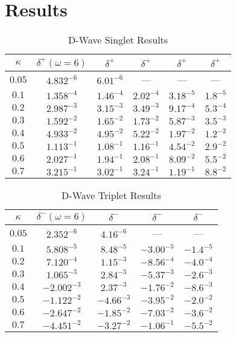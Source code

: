 \documentclass[Dissertation.tex]{subfiles}
\begin{document}
\section{Results}



\begin{table}[H]
\begin{center}
\begin{tabular}{|c|c|c|c|c|c|}
\hline
$\kappa$ & $\delta^+ (\omega = 6)$ & $\delta^+$ \cite{Blackwood2002} & $\delta^+$ \cite{Walters2004} & $\delta^+$ \cite{Ray1997} & $\delta^+$ \cite{Adhikari1999} \\
\hline
$0.05$ & $4.832^{-6}$ & $6.01^{-6}$ & --- & --- & --- \\
$0.1$ & $1.358^{-4}$ & $1.46^{-4}$ & $2.02^{-4}$ & $3.18^{-5}$ & $1.8^{-5}$ \\
$0.2$ & $2.987^{-3}$ & $3.15^{-3}$ & $3.49^{-3}$ & $9.17^{-4}$ & $5.3^{-4}$ \\
$0.3$ & $1.592^{-2}$ & $1.65^{-2}$ & $1.73^{-2}$ & $5.87^{-3}$ & $3.5^{-3}$ \\
$0.4$ & $4.933^{-2}$ & $4.95^{-2}$ & $5.22^{-2}$ & $1.97^{-2}$ & $1.2^{-2}$ \\
$0.5$ & $1.113^{-1}$ & $1.08^{-1}$ & $1.16^{-1}$ & $4.54^{-2}$ & $2.9^{-2}$ \\
$0.6$ & $2.027^{-1}$ & $1.94^{-1}$ & $2.08^{-1}$ & $8.09^{-2}$ & $5.5^{-2}$ \\
$0.7$ & $3.215^{-1}$ & $3.02^{-1}$ & $3.24^{-1}$ & $1.19^{-1}$ & $8.8^{-2}$ \\
\hline
\end{tabular}
\caption{D-Wave Singlet Results}
\label{tab:DWaveSinglet}
\end{center}
\end{table}


\begin{table}[H]
\begin{center}
\begin{tabular}{|c|c|c|c|c|}
\hline
$\kappa$ & $\delta^- (\omega = 6)$ & $\delta^-$ \cite{Blackwood2002} & $\delta^-$ \cite{Ray1997} & $\delta^-$ \cite{Adhikari1999} \\
\hline
$0.05$ & $2.352^{-6}$ & $4.16^{-6}$ & --- & --- \\
$0.1$ & $5.808^{-5}$ & $8.48^{-5}$ & $-3.00^{-5}$ & $-1.4^{-5}$ \\
$0.2$ & $7.120^{-4}$ & $1.15^{-3}$ & $-8.56^{-4}$ & $-4.0^{-4}$ \\
$0.3$ & $1.065^{-3}$ & $2.84^{-3}$ & $-5.37^{-3}$ & $-2.6^{-3}$ \\
$0.4$ & $-2.002^{-3}$ & $2.37^{-3}$ & $-1.76^{-2}$ & $-8.6^{-3}$ \\
$0.5$ & $-1.122^{-2}$ & $-4.66^{-3}$ & $-3.95^{-2}$ & $-2.0^{-2}$ \\
$0.6$ & $-2.647^{-2}$ & $-1.85^{-2}$ & $-7.03^{-2}$ & $-3.6^{-2}$ \\
$0.7$ & $-4.451^{-2}$ & $-3.27^{-2}$ & $-1.06^{-1}$ & $-5.5^{-2}$ \\
\hline
\end{tabular}
\caption{D-Wave Triplet Results}
\label{tab:DWaveTriplet}
\end{center}
\end{table}
\end{document}
